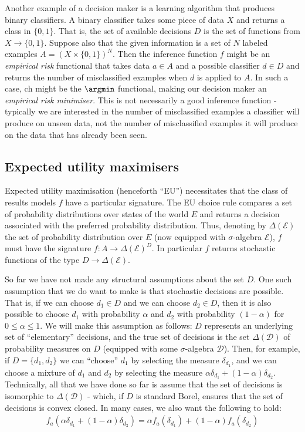 Another example of a decision maker is a learning algorithm that produces binary classifiers. A binary classifier takes some piece of data $X$ and returns a class in $\{0,1\}$. That is, the set of available decisions $D$ is the set of functions from $X\to\{0,1\}$. Suppose also that the given information is a set of $N$ labeled examples $A=(X\times\{0,1\})^N$. Then the inference function $f$ might be an \emph{empirical risk} functional that takes data $a\in A$ and a possible classifier $d\in D$ and returns the number of misclassified examples when $d$ is applied to $A$. In such a case, $\mathrm{ch}$ might be the $\argmin$ functional, making our decision maker an \emph{empirical risk minimiser}. This is not necessarily a good inference function - typically we are interested in the number of misclassified examples a classifier will produce on unseen data, not the number of misclassified examples it will produce on the data that has already been seen.

\subsection{Expected utility maximisers}


Expected utility maximisation (henceforth ``EU'') necessitates that the class of results models $f$ have a particular signature. The EU choice rule compares a set of probability distributions over states of the world $E$ and returns a decision associated with the preferred probability distribution. Thus, denoting by $\Delta(\mathcal{E})$ the set of probability distribution over $E$ (now equipped with $\sigma$-algebra $\mathcal{E}$), $f$ must have the signature $f:A\to \Delta(\mathcal{E})^D$. In particular $f$ returns stochastic functions of the type $D\to \Delta(\mathcal{E})$.

So far we have not made any structural assumptions about the set $D$. One such assumption that we do want to make is that stochastic decisions are possible. That is, if we can choose $d_1\in D$ and we can choose $d_2 \in D$, then it is also possible to choose $d_1$ with probability $\alpha$ and $d_2$ with probability $(1-\alpha)$ for $0\leq \alpha \leq 1$. We will make this assumption as follows: $D$ represents an underlying set of ``elementary'' decisions, and the true set of decisions is the set $\Delta(\mathcal{D})$ of probability measures on $D$ (equipped with some $\sigma$-algebra $\mathcal{D}$). Then, for example, if $D=\{d_1,d_2\}$ we can ``choose'' $d_1$ by selecting the measure $\delta_{d_1}$, and we can choose a mixture of $d_1$ and $d_2$ by selecting the measure $\alpha \delta_{d_1}+(1-\alpha)\delta_{d_2}$. Technically, all that we have done so far is assume that the set of decisions is isomorphic to $\Delta(\mathcal{D})$ - which, if $D$ is standard Borel, ensures that the set of decisions is convex closed. In many cases, we also want the following to hold:
\begin{align}
	f_a(\alpha\delta_{d_1} + (1-\alpha)\delta_{d_2}) = \alpha f_a(\delta_{d_1}) + (1-\alpha) f_a(\delta_{d_2}) \label{eq:additivity}
\end{align}

